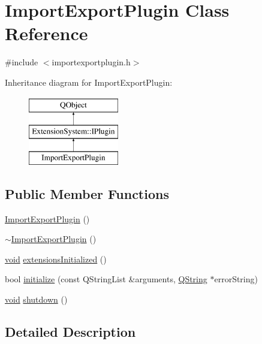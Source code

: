 \hypertarget{class_import_export_plugin}{\section{Import\-Export\-Plugin Class Reference}
\label{class_import_export_plugin}
}


{\ttfamily \#include $<$importexportplugin.\-h$>$}

Inheritance diagram for Import\-Export\-Plugin\-:\begin{figure}[H]
\begin{center}
\leavevmode
\includegraphics[height=3.000000cm]{class_import_export_plugin}
\end{center}
\end{figure}
\subsection*{Public Member Functions}
\begin{DoxyCompactItemize}
\item 
\hyperlink{group__importexportplugin_ga925c9f27737044548e1b28010361c41b}{Import\-Export\-Plugin} ()
\item 
\hyperlink{group__importexportplugin_gaf5eae178665a2798a8172dd3a45ff9af}{$\sim$\-Import\-Export\-Plugin} ()
\item 
\hyperlink{group___u_a_v_objects_plugin_ga444cf2ff3f0ecbe028adce838d373f5c}{void} \hyperlink{group__importexportplugin_ga3ed58e4917d076228fd3020bbcb58dfa}{extensions\-Initialized} ()
\item 
bool \hyperlink{group__importexportplugin_ga933c5c69e64d5980240a5a301043eb52}{initialize} (const Q\-String\-List \&arguments, \hyperlink{group___u_a_v_objects_plugin_gab9d252f49c333c94a72f97ce3105a32d}{Q\-String} $\ast$error\-String)
\item 
\hyperlink{group___u_a_v_objects_plugin_ga444cf2ff3f0ecbe028adce838d373f5c}{void} \hyperlink{group__importexportplugin_ga140c1b62a5f39af6adb314e220eeb996}{shutdown} ()
\end{DoxyCompactItemize}


\subsection{Detailed Description}


